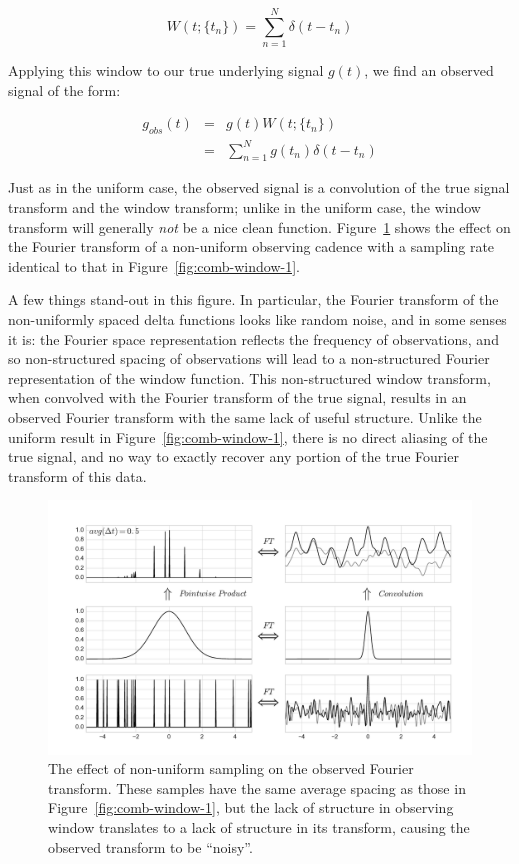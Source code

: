 \documentclass[preprint]{aastex}
\newcommand{\Fig}[1]{Figure~\ref{fig:#1}}
\newcommand{\fig}[1]{Figure~\ref{fig:#1}}
\newcommand{\figlabel}[1]{\label{fig:#1}}
\newcommand{\eqlabel}[1]{\label{eq:#1}}
\begin{document}
\begin{equation}
W(t; \{t_n\}) = \sum_{n=1}^{N} \delta(t - t_n)
\end{equation}

Applying this window to our true underlying signal $g(t)$, we find an observed
signal of the form:

\begin{eqnarray}
  g_{obs}(t) &=& g(t) W(t; \{t_n\}) \nonumber\\
             &=& \sum_{n=1}^{N} g(t_n)\delta(t - t_n)
  \eqlabel{g-nonuniform}
\end{eqnarray}

Just as in the uniform case, the observed signal is a convolution of the true
signal transform and the window transform; unlike in the uniform case, the
window transform will generally {\it not} be a nice clean function.
\Fig{random-window} shows the effect on the Fourier transform of a
non-uniform observing cadence with a sampling rate identical to that
in \fig{comb-window-1}.

A few things stand-out in this figure. In particular, the Fourier transform of
the non-uniformly spaced delta functions looks like random noise, and in some
senses it is: the Fourier space representation reflects the frequency of
observations, and so non-structured spacing of observations will lead to
a non-structured Fourier representation of the window function.
This non-structured window transform, when convolved with the Fourier transform
of the true signal, results in an observed Fourier transform with the same
lack of useful structure.
Unlike the uniform result in \Fig{comb-window-1}, there is no direct aliasing
of the true signal, and no way to exactly recover any portion of the true
Fourier transform of this data.


\begin{figure}[ht]
  \centering
  \includegraphics[width=\textwidth]{fig10_random_window}
  \caption{The effect of non-uniform sampling on the observed Fourier transform.
    These samples have the same average spacing as those in \fig{comb-window-1},
    but the lack of structure in observing window translates to a lack of
    structure in its transform, causing the observed transform to be ``noisy''.
    \figlabel{random-window}}
\end{figure}
\end{document}
